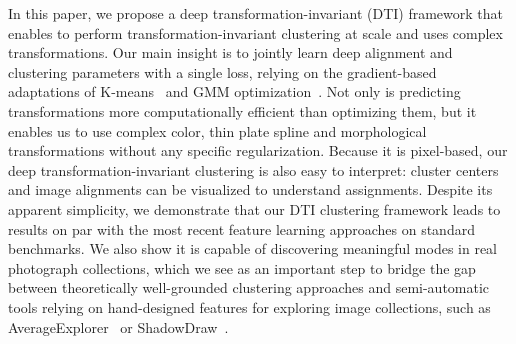 \documentclass{article}
\begin{document}
In this paper, we propose a deep transformation-invariant (DTI) framework that enables to 
perform transformation-invariant clustering at scale and uses complex transformations.  Our 
main insight is to jointly learn deep alignment and clustering parameters with a single loss, 
relying on the gradient-based adaptations of 
K-means~\cite{macqueenMethodsClassificationAnalysis1967} and GMM 
optimization~\cite{dempsterMaximumLikelihoodIncomplete1977}.  Not only is predicting 
transformations more computationally efficient than optimizing them, but it enables us to use 
complex color, thin plate spline and morphological transformations without any specific 
regularization.  Because it is pixel-based, our deep transformation-invariant clustering is 
also easy to interpret: cluster centers and image alignments can be visualized to understand 
assignments. Despite its apparent simplicity, we demonstrate that our DTI clustering 
framework leads to results on par with the most recent feature learning approaches on 
standard benchmarks. We also show it is capable of discovering meaningful modes in real 
photograph collections, which we see as an important step to bridge the gap between 
theoretically well-grounded clustering approaches and semi-automatic tools relying on 
hand-designed features for exploring image collections, such as 
AverageExplorer~\cite{zhu2014averageExplorer} or ShadowDraw~\cite{lee2011shadowdraw}.
\end{document}
